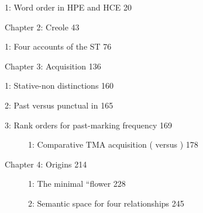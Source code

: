\begin{table}
\caption{1: Word order in HPE and HCE 20}
\label{tab:1}
\end{table}

Chapter 2: Creole 43

\begin{table}
\caption{1: Four accounts of the ST  76}
\label{tab:2}
\end{table}

Chapter 3: Acquisition 136

\begin{table}
\caption{1: Stative-non distinctions  160}
\label{tab:3}
\end{table}

\begin{table}
\caption{2: Past versus punctual in  165}
\label{tab:3}
\end{table}

\begin{table}
\caption{3: Rank orders for past-marking frequency 169}
\label{tab:3}
\end{table}

\begin{figure}
\caption{1: Comparative TMA acquisition ( versus ) 178}
\label{fig:3}
\end{figure}

Chapter 4: Origins 214

\begin{figure}
\caption{1: The minimal ``flower 228}
\label{fig:4}
\end{figure}

\begin{figure}
\caption{2: Semantic space for four relationships 245}
\label{fig:4}
\end{figure}


